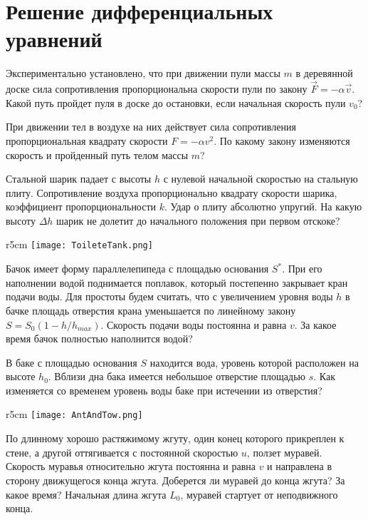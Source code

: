 \section{Решение дифференциальных уравнений}

\AddProb
Экспериментально установлено, что при движении пули массы $m$ в деревянной доске сила сопротивления пропорциональна скорости пули по закону $\vec{F} = - \alpha \vec{v}$. Какой путь пройдет пуля в доске до остановки, если начальная скорость пули $v_0$?

\AddProb При движении тел в воздухе на них действует сила сопротивления пропорциональная квадрату скорости $F = - \alpha v^2$. По какому закону изменяются скорость и пройденный путь телом массы $m$?

\AddProb Стальной шарик падает с высоты $h$ с нулевой начальной скоростью на стальную плиту. Сопротивление воздуха пропорционально квадрату скорости шарика, коэффициент пропорциональности $k$. Удар о плиту абсолютно упругий. На какую высоту $\Delta h$ шарик не долетит до начального положения при первом отскоке?

\begin{wrapfigure}{r}{5cm}
\texttt{[image: ToileteTank.png]}
\end{wrapfigure}

\AddProb Бачок имеет форму параллелепипеда с площадью основания $S^*$. При его наполнении водой поднимается поплавок, который постепенно закрывает кран подачи воды. Для простоты будем считать, что с увеличением уровня воды $h$ в бачке площадь отверстия крана уменьшается по линейному закону $S = S_0 (1 - h/h_{max})$. Скорость подачи воды постоянна и равна $v$. За какое время бачок полностью наполнится водой?

\AddProb В баке с площадью основания $S$ находится вода, уровень которой расположен на высоте $h_0$. Вблизи дна бака имеется небольшое отверстие площадью $s$. Как изменяется со временем уровень воды баке при истечении из отверстия?

\begin{wrapfigure}{r}{5cm}
\texttt{[image: AntAndTow.png]}
\end{wrapfigure}
\AddProb По длинному хорошо растяжимому жгуту, один конец которого прикреплен к стене, а другой оттягивается с постоянной скоростью $u$, ползет муравей. Скорость муравья относительно жгута постоянна и равна $v$ и направлена в сторону движущегося конца жгута. Доберется ли муравей до конца жгута? За какое время? Начальная длина жгута $L_0$, муравей стартует от неподвижного конца.

